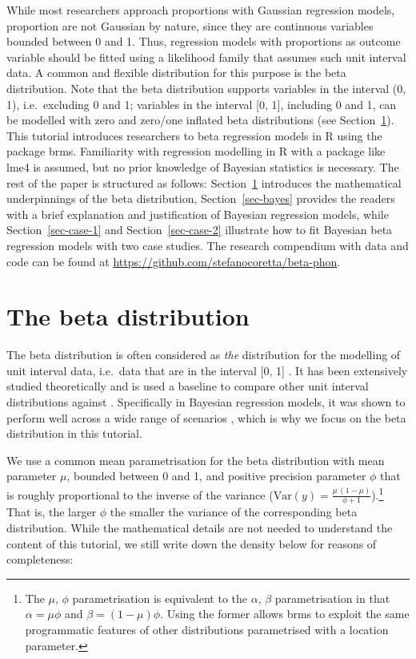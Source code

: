 \documentclass[
  authoryear,
  preprint,
  3p]{elsarticle}
\begin{document}
While most researchers approach proportions with Gaussian regression
models, proportion are not Gaussian by nature, since they are continuous
variables bounded between 0 and 1. Thus, regression models with
proportions as outcome variable should be fitted using a likelihood
family that assumes such unit interval data. A common and flexible
distribution for this purpose is the beta distribution. Note that the
beta distribution supports variables in the interval (0, 1),
i.e.~excluding 0 and 1; variables in the interval {[}0, 1{]}, including
0 and 1, can be modelled with zero and zero/one inflated beta
distributions (see Section~\ref{sec-beta}). This tutorial introduces
researchers to beta regression models in R using the package brms.
Familiarity with regression modelling in R with a package like lme4 is
assumed, but no prior knowledge of Bayesian statistics is necessary. The
rest of the paper is structured as follows: Section~\ref{sec-beta}
introduces the mathematical underpinnings of the beta distribution,
Section~\ref{sec-bayes} provides the readers with a brief explanation
and justification of Bayesian regression models, while
Section~\ref{sec-case-1} and Section~\ref{sec-case-2} illustrate how to
fit Bayesian beta regression models with two case studies. The research
compendium with data and code can be found at
\url{https://github.com/stefanocoretta/beta-phon}.

\section{The beta distribution}\label{sec-beta}

The beta distribution is often considered as \emph{the} distribution for
the modelling of unit interval data, i.e.~data that are in the interval
{[}0, 1{]} \citep{ferrari_beta_2004, cribari-neto_beta_2010}. It has
been extensively studied theoretically
\citep{krysicki_new_1999, gupta_handbook_2014, espinheira_beta_2008} and
is used a baseline to compare other unit interval distributions against
\citep{kieschnick_regression_2003, bonat_regression_2013, lopez_bayesian_2013}.
Specifically in Bayesian regression models, it was shown to perform well
across a wide range of scenarios
\citep{scholz_posterior_2023, scholz_prediction_2025}, which is why we
focus on the beta distribution in this tutorial.

We use a common mean parametrisation for the beta distribution with mean
parameter \(\mu\), bounded between 0 and 1, and positive precision
parameter \(\phi\) that is roughly proportional to the inverse of the
variance
(\(\text{Var}(y) = \frac{\mu \, (1 - \mu)}{\phi + 1}\)).\footnote{The
  \(\mu\), \(\phi\) parametrisation is equivalent to the \(\alpha\),
  \(\beta\) parametrisation in that \(\alpha = \mu\phi\) and
  \(\beta = (1-\mu)\phi\). Using the former allows brms to exploit the
  same programmatic features of other distributions parametrised with a
  location parameter.} That is, the larger \(\phi\) the smaller the
variance of the corresponding beta distribution. While the mathematical
details are not needed to understand the content of this tutorial, we
still write down the density below for reasons of completeness:
\end{document}
